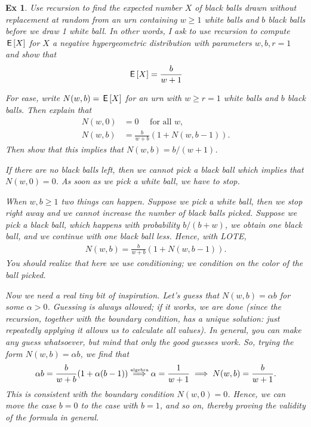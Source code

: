 \documentclass[a4paper,11pt]{article}
\newtheorem{exercise}[theorem]{Ex}
\begin{document}
\begin{exercise}
Use recursion to find the expected number $X$ of black balls drawn without replacement at random from an urn containing $w\geq 1$ white balls and $b$ black balls before we draw 1 white ball.
In other words, I ask to use recursion to compute $\,\mathsf{E}\left[X\right]$ for $X$ a negative hypergeometric distribution with parameters $w,b, r=1$ and show that
\begin{align}
  \label{eq:727}
\,\mathsf{E}\left[X\right] = \frac{b}{w+1}
\end{align}
\begin{hint}
For ease, write $N(w,b)= \,\mathsf{E}\left[X\right]$ for an  urn with $w\geq r = 1$ white balls and $b$ black balls. Then explain that
\begin{align}
N(w, 0) &= 0\quad \text{ for all $w$},\\
  N(w,b) &= \frac{b}{w+b} (1+N(w, b-1)).
\end{align}
Then show that this implies that $N(w,b) = b/ (w+1)$.
\end{hint}
\begin{solution}
If there are no black balls left, then we cannot pick a black ball which implies that $N(w, 0) = 0$.
As soon as we pick a white ball, we have to stop.

When $w, b \geq 1$ two things can happen.
Suppose we pick a white ball, then we stop right away and we cannot increase the number of black balls picked.
Suppose we pick a black ball, which happens with probability $b/(b+w)$, we obtain one black ball, and we continue with one black ball less.
Hence, with LOTE,
\begin{align}
  N(w,b) = \frac{b}{w+b} (1+N(w, b-1)).
\end{align}
You should realize that here we use conditioning; we condition on the color of the ball picked.

Now we need a real tiny bit of inspiration.
Let's \emph{guess} that $N(w,b)=\alpha b$ for some $\alpha>0$.
Guessing is always allowed; if it works, we are done (since the recursion, together with the boundary condition, has a unique solution: just repeatedly applying it allows us to calculate all values).
In general, you can make any guess whatsoever, but mind that only the good guesses work. So, trying the form $N(w,b) = \alpha b$, we find that
\begin{equation*}
\alpha b = \frac{b}{w+b} (1+ \alpha (b-1)) \stackrel{\textrm{\tiny algebra}}{\implies} \alpha = \frac{1}{w+1} \implies  N(w, b) = \frac{b }{w+1}.
\end{equation*}
This is consistent with the boundary condition $N(w,0)=0$. Hence, we can move the case $b=0$ to the case with $b=1$, and so on, thereby proving the validity of the formula in general.
\end{solution}
\end{exercise}
\end{document}
